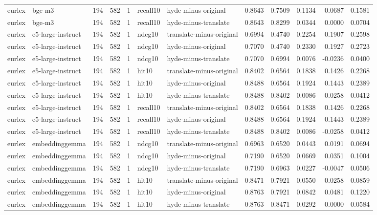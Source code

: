 \begin{tabular}{llrrrllrrrrr}
eurlex & bge-m3 & 194 & 582 & 1 & recall10 & hyde-minus-original & 0.8643 & 0.7509 & 0.1134 & 0.0687 & 0.1581 \\
eurlex & bge-m3 & 194 & 582 & 1 & recall10 & hyde-minus-translate & 0.8643 & 0.8299 & 0.0344 & 0.0000 & 0.0704 \\
eurlex & e5-large-instruct & 194 & 582 & 1 & ndcg10 & translate-minus-original & 0.6994 & 0.4740 & 0.2254 & 0.1907 & 0.2598 \\
eurlex & e5-large-instruct & 194 & 582 & 1 & ndcg10 & hyde-minus-original & 0.7070 & 0.4740 & 0.2330 & 0.1927 & 0.2723 \\
eurlex & e5-large-instruct & 194 & 582 & 1 & ndcg10 & hyde-minus-translate & 0.7070 & 0.6994 & 0.0076 & -0.0236 & 0.0400 \\
eurlex & e5-large-instruct & 194 & 582 & 1 & hit10 & translate-minus-original & 0.8402 & 0.6564 & 0.1838 & 0.1426 & 0.2268 \\
eurlex & e5-large-instruct & 194 & 582 & 1 & hit10 & hyde-minus-original & 0.8488 & 0.6564 & 0.1924 & 0.1443 & 0.2389 \\
eurlex & e5-large-instruct & 194 & 582 & 1 & hit10 & hyde-minus-translate & 0.8488 & 0.8402 & 0.0086 & -0.0258 & 0.0412 \\
eurlex & e5-large-instruct & 194 & 582 & 1 & recall10 & translate-minus-original & 0.8402 & 0.6564 & 0.1838 & 0.1426 & 0.2268 \\
eurlex & e5-large-instruct & 194 & 582 & 1 & recall10 & hyde-minus-original & 0.8488 & 0.6564 & 0.1924 & 0.1443 & 0.2389 \\
eurlex & e5-large-instruct & 194 & 582 & 1 & recall10 & hyde-minus-translate & 0.8488 & 0.8402 & 0.0086 & -0.0258 & 0.0412 \\
eurlex & embeddinggemma & 194 & 582 & 1 & ndcg10 & translate-minus-original & 0.6963 & 0.6520 & 0.0443 & 0.0191 & 0.0694 \\
eurlex & embeddinggemma & 194 & 582 & 1 & ndcg10 & hyde-minus-original & 0.7190 & 0.6520 & 0.0669 & 0.0351 & 0.1004 \\
eurlex & embeddinggemma & 194 & 582 & 1 & ndcg10 & hyde-minus-translate & 0.7190 & 0.6963 & 0.0227 & -0.0047 & 0.0506 \\
eurlex & embeddinggemma & 194 & 582 & 1 & hit10 & translate-minus-original & 0.8471 & 0.7921 & 0.0550 & 0.0258 & 0.0859 \\
eurlex & embeddinggemma & 194 & 582 & 1 & hit10 & hyde-minus-original & 0.8763 & 0.7921 & 0.0842 & 0.0481 & 0.1220 \\
eurlex & embeddinggemma & 194 & 582 & 1 & hit10 & hyde-minus-translate & 0.8763 & 0.8471 & 0.0292 & -0.0000 & 0.0584 \\

\end{tabular}
